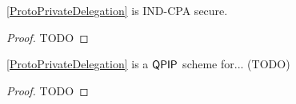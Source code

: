 \begin{thm}
	\autoref{ProtoPrivateDelegation} is IND-CPA secure.
\end{thm}
\begin{proof}
	TODO
\end{proof}

\begin{thm}
	\autoref{ProtoPrivateDelegation} is a $\operatorname{\mathsf{QPIP}}$ scheme for... (TODO) 
\end{thm}
\begin{proof}
	TODO
\end{proof}

